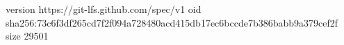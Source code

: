 version https://git-lfs.github.com/spec/v1
oid sha256:73c6f3df265cd7f2f094a728480acd415db17ec6bccde7b386babb9a379cef2f
size 29501
